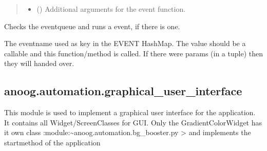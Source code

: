 \documentclass[letterpaper,10pt,english]{sphinxmanual}
\begin{document}
\begin{fulllineitems}
\begin{fulllineitems}
\begin{quote}
\begin{description}
\begin{itemize}
\item {} 
\sphinxAtStartPar
{} (\sphinxstyleliteralemphasis{\sphinxupquote{, }}) \textendash{} Additional arguments for the event function.

\end{itemize}

\end{description}\end{quote}

\end{fulllineitems}


\begin{fulllineitems}
\label{\detokenize{anoog.automation:anoog.automation.event.Eventsystem_Component.run_event}}
\sphinxAtStartPar
Checks the event\sphinxhyphen{}queue and runs a event, if there is one.

\sphinxAtStartPar
The eventname used as key in the EVENT HashMap.
The value should be a callable and this function/method is called.
If there were params (in a tuple) then they will handed over.

\end{fulllineitems}


\end{fulllineitems}



\subsection{anoog.automation.graphical\_user\_interface}
\label{\detokenize{anoog.automation:module-anoog.automation.graphical_user_interface}}\label{\detokenize{anoog.automation:anoog-automation-graphical-user-interface}}\label{\detokenize{anoog.automation:gui}}
\sphinxAtStartPar
This module is used to implement a graphical user interface for the application.
It contains all Widget/Screen\sphinxhyphen{}Classes for GUI. Only the Gradient\sphinxhyphen{}Color\sphinxhyphen{}Widget has it own class :module:\textasciitilde{}anoog.automation.bg\_booster.py
\sphinxhyphen{}\textgreater{} and implements the start\sphinxhyphen{}method of the application
\end{document}
